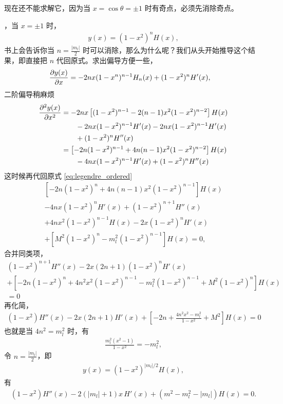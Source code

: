 现在还不能求解它，因为当 $x = \cos\theta = \pm1$ 时有奇点，必须先消除奇点。

，当 $x = \pm 1$ 时，
\begin{align}
    y(x) = (1 - x^2)^n H(x),
\end{align}
书上会告诉你当 $n = \frac{|m_l|}2$ 时可以消除，那么为什么呢？我们从头开始推导这个结果，即直接把 $n$ 代回原式。求出偏导方便一些，
\begin{align}
    &\pdv{y(x)}{x} = -2n x (1-x^n)^{n-1} H_n(x) + (1-x^2)^n H'(x),
\end{align}
二阶偏导稍麻烦
\begin{align}
    \pdv[2]{y(x)}{x} &= -2n x \left[
        (1-x^2)^{n-1} - 2(n-1)x^2(1-x^2)^{n-2}
    \right]H(x)  \notag\\
    &\quad\quad
    - 2n x(1-x^2)^{n-1} H'(x) 
    - 2n x(1-x^2)^{n-1} H'(x) \notag\\
    &\quad\quad + (1-x^2)^n H''(x) \\
    & = \left[
        -2n (1-x^2)^{n-1} + 4n (n-1) x^2 (1-x^2)^{n-2}
    \right] H(x) \notag\\
    &\quad\quad - 4nx(1-x^2)^{n-1} H'(x) + 
    (1-x^2)^n H''(x)
\end{align}
这时候再代回原式 \eqref{eq:legendre_ordered}
\begin{multline}
    \left[
        -2n (1-x^2)^n + 4n(n-1) x^2 (1-x^2)^{n-1}
    \right] H(x) \\
    - 4nx(1-x^2)^n H'(x) + (1-x^2)^{n+1} H''(x) \\
    + 4nx^2 (1-x^2)^{n-1} H(x) 
    - 2x (1-x^2)^n H'(x) \\
    +\left[
        M^2 (1-x^2)^n - m_l^2 (1-x^2) ^{n-1}
    \right] H(x) = 0,
\end{multline}
合并同类项，
\begin{multline}
    (1-x^2)^{n+1} H''(x) - 2x(2n+1) (1-x^2)^n H'(x) 
    \\+ 
    \left[
        -2n (1-x^2)^n + 4n^2 x^2 (1-x^2)^{n-1} - m_l^2 (1-x^2)^{n-1} + M^2 (1-x^2)^n
    \right] H(x) \\= 0
\end{multline}
再化简，
\begin{align}
    (1-x^2) H''(x) - 2x(2n+1) H'(x) + \left[
        -2n + \frac{4n^2x^2 - m_l^2}{1-x^2} + M^2
    \right] H(x) = 0
\end{align}
也就是当 $4n^2 = m_l^2$ 时，有
\begin{align}
    \frac{m_l^2 (x^2 - 1)}{1 - x^2} = - m_l^2,
\end{align}
令 $n = \frac{|m_l|}2$，即
\begin{align}
    y(x) = (1 - x^2)^{|m_l|/2} H(x),
\end{align}
有
\begin{align}
    (1-x^2) H''(x) - 2\left(|m_l| + 1\right)x \, H'(x) + \left(m^2 - m_l^2 - |m_l|\right) H(x) = 0. 
\end{align}

